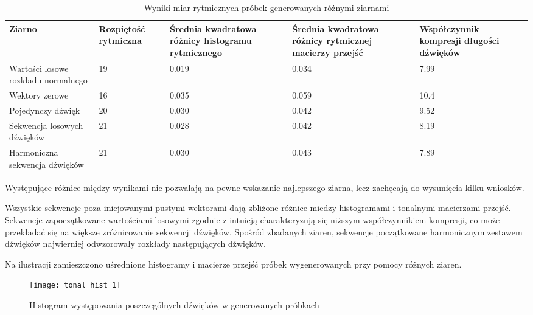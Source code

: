 {{        \begin{table}
            \begin{center}
                \begin{tabular}{ |p{2.5cm}|p{2.5cm}|p{2.5cm}|p{2.5cm}|p{2.5cm}| }
                \hline
                Ziarno & Rozpiętość rytmiczna & Średnia kwadratowa różnicy histogramu rytmicznego & Średnia kwadratowa różnicy rytmicznej macierzy przejść & Współczynnik kompresji długości dźwięków \\ 
                \hline
                \hline
                Wartości losowe rozkładu normalnego & 19 & 0.019 & 0.034 & 7.99 \\  
                \hline
                Wektory zerowe & 16 & 0.035 & 0.059 & 10.4 \\
                \hline
                Pojedynczy dźwięk & 20 & 0.030 & 0.042 & 9.52 \\
                \hline
                Sekwencja losowych dźwięków & 21 & 0.028 & 0.042 & 8.19 \\
                \hline
                Harmoniczna sekwencja dźwięków & 21 & 0.030 & 0.043 & 7.89 \\
                \hline
                \end{tabular}
            \end{center}
            \caption{Wyniki miar rytmicznych próbek generowanych różnymi ziarnami} \label{rythm_measuremnts_table}
        \end{table}

        Występujące różnice między wynikami nie pozwalają na pewne wskazanie najlepszego ziarna, lecz 
        zachęcają do wysunięcia kilku wniosków.

        Wszystkie sekwencje poza inicjowanymi pustymi wektorami dają zbliżone różnice miedzy histogramami i 
        tonalnymi macierzami przejść. 
        Sekwencje zapoczątkowane wartościami losowymi zgodnie z intuicją charakteryzują się niższym współczynnikiem
        kompresji, co może przekładać się na większe zróżnicowanie sekwencji dźwięków.
        Spośród zbadanych ziaren, sekwencje początkowane harmonicznym zestawem dźwięków najwierniej
        odwzorowały rozkłady następujących dźwięków.
        
        Na ilustracji zamieszczono uśrednione histogramy i macierze przejść próbek wygenerowanych przy pomocy różnych ziaren.

        \begin{figure}
            \centering
            \texttt{[image: tonal\_hist\_1]}
            \caption{Histogram występowania poszczególnych dźwięków w generowanych próbkach}
            \label{tonal_hist_1}
        \end{figure}

}}
